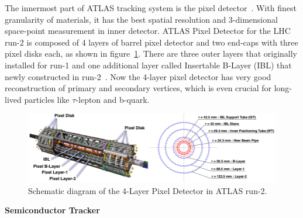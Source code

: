 The innermost part of ATLAS tracking system is the pixel detector~\cite{pixel_2008}.
With finest granularity of materials, it has the best spatial resolution and 3-dimensional space-point measurement in inner detector.
ATLAS Pixel Detector for the LHC run-2 is composed of 4 layers of barrel pixel detector and two end-caps with three pixel disks each, as shown in figure~\ref{fig:inner_pixel}.
There are three outer layers that originally installed for run-1 and one additional layer called Insertable B-Layer (IBL) that newly constructed in run-2~\cite{Mullier:2016}.
Now the 4-layer pixel detector has very good reconstruction of primary and secondary vertices, which is even crucial for long-lived particles like $\tau$-lepton and b-quark.
\begin{figure}[!htb]
  \centering
  \includegraphics[width=1.0\textwidth]{figures/Detector/inner_pixel.png}
  \caption{Schematic diagram of the 4-Layer Pixel Detector in ATLAS run-2.}
  \label{fig:inner_pixel}
\end{figure}

\textbf{Semiconductor Tracker}

